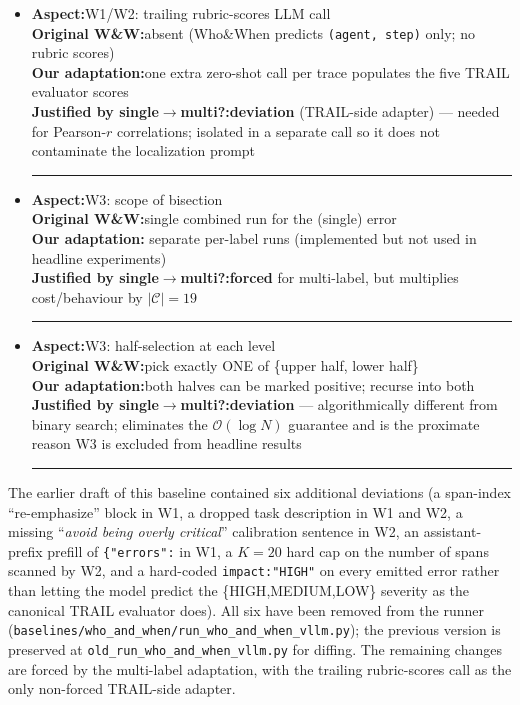 \begin{itemize}
\item \textbf{Aspect:}\enspace \textsc{W1}/\textsc{W2}: trailing rubric-scores LLM call\\
      \textbf{Original W\&W:}\enspace absent (Who\&When predicts \texttt{(agent, step)} only; no rubric scores)\\
      \textbf{Our adaptation:}\enspace one extra zero-shot call per trace populates the five TRAIL evaluator scores\\
      \textbf{Justified by single$\to$multi?:}\enspace \textbf{deviation} (TRAIL-side adapter) --- needed for Pearson-$r$ correlations; isolated in a separate call so it does not contaminate the localization prompt\\
      \rule{\linewidth}{0.4pt}

\item \textbf{Aspect:}\enspace \textsc{W3}: scope of bisection\\
      \textbf{Original W\&W:}\enspace single combined run for the (single) error\\
      \textbf{Our adaptation:} separate per-label runs (implemented but not used in headline experiments)\\
      \textbf{Justified by single$\to$multi?:}\enspace \textbf{forced} for multi-label, but multiplies cost/behaviour by $|\mathcal{C}|=19$\\
      \rule{\linewidth}{0.4pt}

\item \textbf{Aspect:}\enspace \textsc{W3}: half-selection at each level\\
      \textbf{Original W\&W:}\enspace pick exactly ONE of \{upper half, lower half\}\\
      \textbf{Our adaptation:}\enspace both halves can be marked positive; recurse into both\\
      \textbf{Justified by single$\to$multi?:}\enspace \textbf{deviation} --- algorithmically different from binary search; eliminates the $\mathcal{O}(\log N)$ guarantee and is the proximate reason \textsc{W3} is excluded from headline results\\
      \rule{\linewidth}{0.4pt}

\end{itemize}

The earlier draft of this baseline contained six additional deviations
(a span-index ``re-emphasize'' block in \textsc{W1}, a dropped task
description in \textsc{W1} and \textsc{W2}, a missing
``\emph{avoid being overly critical}'' calibration sentence in
\textsc{W2}, an assistant-prefix prefill of \texttt{\{"errors":} in
\textsc{W1}, a $K{=}20$ hard cap on the number of spans scanned by
\textsc{W2}, and a hard-coded \texttt{impact:"HIGH"} on every emitted
error rather than letting the model predict the
\{\textsc{HIGH},\textsc{MEDIUM},\textsc{LOW}\} severity as the canonical
TRAIL evaluator does). All six have been removed from the runner
(\texttt{baselines/who\_and\_when/run\_who\_and\_when\_vllm.py}); the
previous version is preserved at \texttt{old\_run\_who\_and\_when\_vllm.py}
for diffing. The remaining changes are forced by the multi-label
adaptation, with the trailing rubric-scores call as the only
non-forced TRAIL-side adapter.
